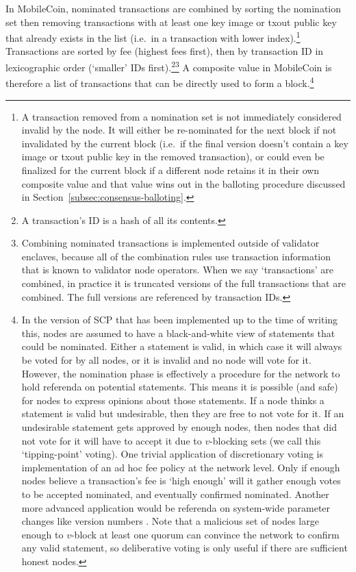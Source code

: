 In MobileCoin, nominated transactions are combined by sorting the nomination set then removing transactions with at least one key image or txout public key that already exists in the list (i.e.\ in a transaction with lower index).\footnote{A transaction removed from a nomination set is not immediately considered invalid by the node. It will either be re-nominated for the next block if not invalidated by the current block (i.e.\ if the final version doesn't contain a key image or txout public key in the removed transaction), or could even be finalized for the current block if a different node retains it in their own composite value and that value wins out in the balloting procedure discussed in Section~\ref{subsec:consensus-balloting}.} Transactions are sorted by fee (highest fees first), then by transaction ID in lexicographic order (`smaller' IDs first).\footnote{A transaction's ID is a hash of all its contents.}\footnote{Combining nominated transactions is implemented outside of validator enclaves, because all of the combination rules use transaction information that is known to validator node operators. When we say `transactions' are combined, in practice it is truncated versions of the full transactions that are combined. The full versions are referenced by transaction IDs.} A composite value in MobileCoin is therefore a list of transactions that can be directly used to form a block.\footnote{\label{footnote:scp-tipping-point-voting}In the version of SCP that has been implemented up to the time of writing this, nodes are assumed to have a black-and-white view of statements that could be nominated. Either a statement is valid, in which case it will always be voted for by all nodes, or it is invalid and no node will vote for it. However, the nomination phase is effectively a procedure for the network to hold referenda on potential statements. This means it is possible (and safe) for nodes to express opinions about those statements. If a node thinks a statement is valid but undesirable, then they are free to not vote for it. If an undesirable statement gets approved by enough nodes, then nodes that did not vote for it will have to accept it due to $v$-blocking sets (we call this `tipping-point' voting). One trivial application of discretionary voting is implementation of an ad hoc fee policy at the network level. Only if enough nodes believe a transaction's fee is `high enough' will it gather enough votes to be accepted nominated, and eventually confirmed nominated. Another more advanced application would be referenda on system-wide parameter changes like version numbers \cite{rfc-mobilecoin-hardforks}. Note that a malicious set of nodes large enough to $v$-block at least one quorum can convince the network to confirm any valid statement, so deliberative voting is only useful if there are sufficient honest nodes.}

